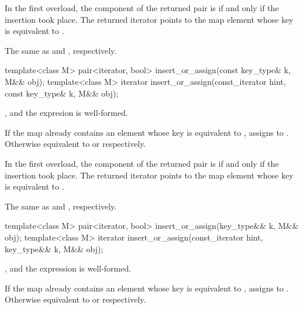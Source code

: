 \begin{codeblock}
\begin{codeblock}
\begin{codeblock}
\begin{addedblock}
\begin{itemdescr}
\pnum
\returns
In the first overload,
the  component of the returned pair is 
if and only if the insertion took place.
The returned iterator points to the map element
whose key is equivalent to .

\pnum
\complexity
The same as  and ,
respectively.
\end{itemdescr}

%
\begin{itemdecl}
template<class M>
  pair<iterator, bool> insert_or_assign(const key_type& k, M&& obj);
template<class M>
  iterator insert_or_assign(const_iterator hint, const key_type& k, M&& obj);
\end{itemdecl}

\begin{itemdescr}
\pnum
\constraints
{}, and the expresion
 is well-formed.

\pnum
\effects
If the map already contains an element 
whose key is equivalent to ,
assigns  to .
Otherwise equivalent to  or
 respectively.

\pnum
\returns
In the first overload,
the  component of the returned pair is 
if and only if the insertion took place.
The returned iterator points to the map element
whose key is equivalent to .

\pnum
\complexity
The same as  and ,
respectively.
\end{itemdescr}

%
\begin{itemdecl}
template<class M>
  pair<iterator, bool> insert_or_assign(key_type&& k, M&& obj);
template<class M>
  iterator insert_or_assign(const_iterator hint, key_type&& k, M&& obj);
\end{itemdecl}

\begin{itemdescr}
\pnum
\constraints
{}, and the expression
 is well-formed.

\pnum
\effects
If the map already contains an element 
whose key is equivalent to ,
assigns  to .
Otherwise equivalent to  or
 respectively.


\end{itemdescr}
\end{addedblock}
\end{codeblock}
\end{codeblock}
\end{codeblock}
